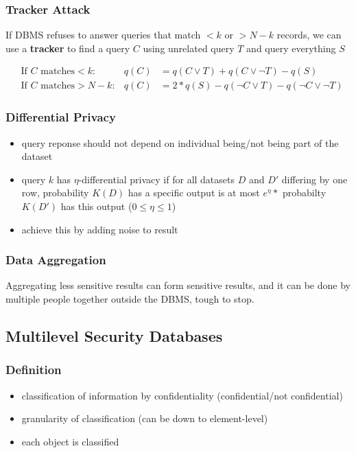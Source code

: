 \documentclass[]{article}
\theoremstyle{definition}
\begin{document}
	\subsubsection{Tracker Attack}
	If DBMS refuses to answer queries that match $<k$ or $> N-k$ records, we can use a \textbf{tracker} to find a query $C$ using unrelated query $T$ and query everything $S$


	\begin{align*}
		&\text{If $C$ matches} <k : & q(C) & = q(C \vee T) + q(C \vee \neg T) - q(S) \\
		&\text{If $C$ matches} > N - k: & q(C) & = 2*q(S) - q(\neg C \vee T) - q(\neg C \vee \neg T)
	\end{align*}

	\subsubsection{Differential Privacy}
	\begin{itemize}
		\item query reponse should not depend on individual being/not being part of the dataset
		\item query $k$ has $\eta$-differential privacy if for all datasets $D$ and $D'$ differing by one row, probability $K(D)$ has a specific output is at most $e^{\eta}*$ probabilty $K(D')$ has this output ($0 \leq \eta \leq 1$)
		\item achieve this by adding noise to result
	\end{itemize}

	\subsubsection{Data Aggregation}
	Aggregating less sensitive results can form sensitive results, and it can be done by multiple people together outside the DBMS, tough to stop.

	\subsection{Multilevel Security Databases}
	\subsubsection{Definition}
	\begin{itemize}
		\item classification of information by confidentiality (confidential/not confidential)
		\item granularity of classification (can be down to element-level)
		\item each object is classified
	\end{itemize}
\end{document}
